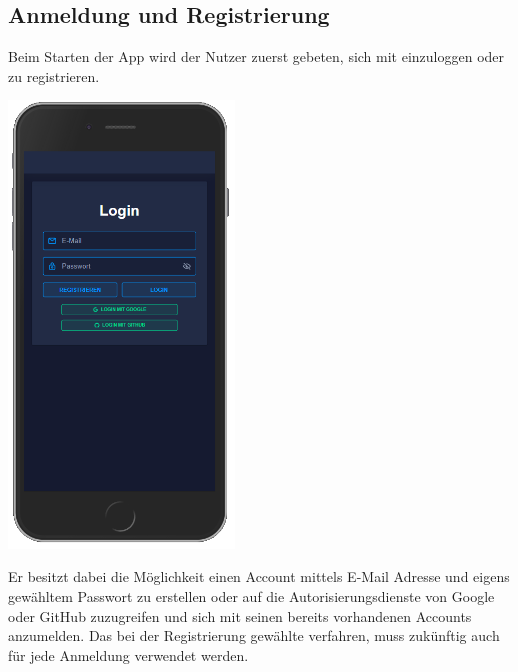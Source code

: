 \documentclass[a4paper]{article}
\theoremstyle{definition}
\begin{document}
\subsection*{Anmeldung und Registrierung}
Beim Starten der App wird der Nutzer zuerst gebeten, sich mit einzuloggen oder zu registrieren.
\vspace{0.25cm}
\begin{center}
	\includegraphics[width= 6cm, keepaspectratio]{img/login}
\end{center}
\vspace{0.25cm}
Er besitzt dabei die Möglichkeit einen Account mittels E-Mail Adresse und eigens gewähltem Passwort zu erstellen oder auf die Autorisierungsdienste von Google oder GitHub zuzugreifen und sich mit seinen bereits vorhandenen Accounts anzumelden. Das bei der Registrierung gewählte verfahren, muss zukünftig auch für jede Anmeldung verwendet werden.
\newpage
\end{document}
